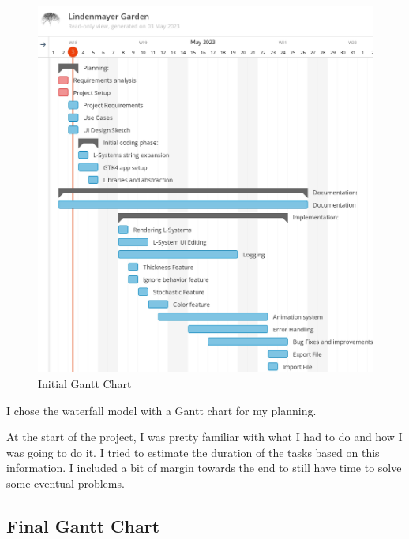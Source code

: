\documentclass[a4paper]{article}
\begin{document}
\begin{figure}[h]
    \includegraphics[width=\textwidth]{media/gantt/gantt1.jpg}
    \caption{Initial Gantt Chart}
\end{figure}

I chose the \gls{waterfall} model with a \Gls{Gantt} chart for my planning.

At the start of the project, I was pretty familiar with what I had to do
and how I was going to do it.
I tried to estimate the duration of the tasks based on this information.
I included a bit of margin towards the end to still have time to solve some eventual problems.

\pagebreak

\subsection{Final Gantt Chart}
\end{document}
